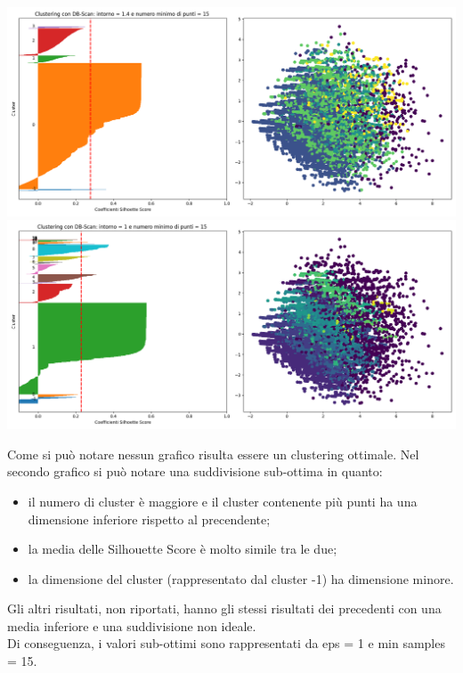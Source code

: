 \documentclass[a4paper, 10pt]{report}
\begin{document}
                \begin{center}
                    \includegraphics[width=14cm]{evaluation/DBScan_1.4_15.png}
                    \includegraphics[width=14cm]{evaluation/DBScan_1-15.png} \\
                \end{center}

                Come si può notare nessun grafico risulta essere un clustering ottimale.
                Nel secondo grafico si può notare una suddivisione sub-ottima in quanto:
                \begin{itemize}
                    \item il numero di cluster è maggiore e il cluster contenente più punti ha una dimensione inferiore rispetto al precendente;
                    \item la media delle Silhouette Score è molto simile tra le due;
                    \item la dimensione del cluster (rappresentato dal cluster -1) ha dimensione minore.
                \end{itemize}

                Gli altri risultati, non riportati, hanno gli stessi risultati dei precedenti con una media inferiore e
                una suddivisione non ideale.
                \\Di conseguenza, i valori sub-ottimi sono rappresentati da eps = 1 e min samples = 15.
\end{document}
